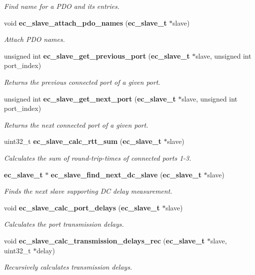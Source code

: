 \begin{DoxyCompactItemize}
\begin{DoxyCompactList}\small\item\em \-Find name for a \-P\-D\-O and its entries. \end{DoxyCompactList}\item 
void {\bf ec\-\_\-slave\-\_\-attach\-\_\-pdo\-\_\-names} ({\bf ec\-\_\-slave\-\_\-t} $\ast$slave)\label{slave_8c_a659775cbc8fdb6d41fe70eb9298d2780}

\begin{DoxyCompactList}\small\item\em \-Attach \-P\-D\-O names. \end{DoxyCompactList}\item 
unsigned int {\bf ec\-\_\-slave\-\_\-get\-\_\-previous\-\_\-port} ({\bf ec\-\_\-slave\-\_\-t} $\ast$slave, unsigned int port\-\_\-index)
\begin{DoxyCompactList}\small\item\em \-Returns the previous connected port of a given port. \end{DoxyCompactList}\item 
unsigned int {\bf ec\-\_\-slave\-\_\-get\-\_\-next\-\_\-port} ({\bf ec\-\_\-slave\-\_\-t} $\ast$slave, unsigned int port\-\_\-index)
\begin{DoxyCompactList}\small\item\em \-Returns the next connected port of a given port. \end{DoxyCompactList}\item 
uint32\-\_\-t {\bf ec\-\_\-slave\-\_\-calc\-\_\-rtt\-\_\-sum} ({\bf ec\-\_\-slave\-\_\-t} $\ast$slave)
\begin{DoxyCompactList}\small\item\em \-Calculates the sum of round-\/trip-\/times of connected ports 1-\/3. \end{DoxyCompactList}\item 
{\bf ec\-\_\-slave\-\_\-t} $\ast$ {\bf ec\-\_\-slave\-\_\-find\-\_\-next\-\_\-dc\-\_\-slave} ({\bf ec\-\_\-slave\-\_\-t} $\ast$slave)
\begin{DoxyCompactList}\small\item\em \-Finds the next slave supporting \-D\-C delay measurement. \end{DoxyCompactList}\item 
void {\bf ec\-\_\-slave\-\_\-calc\-\_\-port\-\_\-delays} ({\bf ec\-\_\-slave\-\_\-t} $\ast$slave)
\begin{DoxyCompactList}\small\item\em \-Calculates the port transmission delays. \end{DoxyCompactList}\item 
void {\bf ec\-\_\-slave\-\_\-calc\-\_\-transmission\-\_\-delays\-\_\-rec} ({\bf ec\-\_\-slave\-\_\-t} $\ast$slave, uint32\-\_\-t $\ast$delay)
\begin{DoxyCompactList}\small\item\em \-Recursively calculates transmission delays. \end{DoxyCompactList}\end{DoxyCompactItemize}
